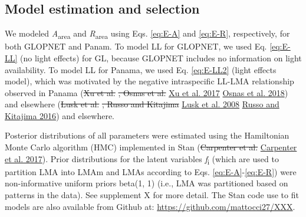 \documentclass[
  12pt,
]{article}
\providecommand{\DIFaddtex}[1]{{\protect\color{blue}\uwave{#1}}} %
\providecommand{\DIFdeltex}[1]{{\protect\color{red}\sout{#1}}}                      %
\providecommand{\DIFaddbegin}{} %
\providecommand{\DIFaddend}{} %
\providecommand{\DIFdelbegin}{} %
\providecommand{\DIFdelend}{} %
\providecommand{\DIFadd}[1]{\texorpdfstring{\DIFaddtex{#1}}{#1}} %
\providecommand{\DIFdel}[1]{\texorpdfstring{\DIFdeltex{#1}}{}} %
\newcommand{\DIFscaledelfig}{0.5}
\newlength{\DIFdelgraphicswidth} %
\newlength{\DIFdelgraphicsheight} %
\newcommand{\DIFaddincludegraphics}[2][]{{\color{blue}\fbox{\DIFOincludegraphics[#1]{#2}}}} %
\newcommand{\DIFdelincludegraphics}[2][]{%
\sbox{\DIFdelgraphicsbox}{\DIFOincludegraphics[#1]{#2}}%
\settoboxwidth{\DIFdelgraphicswidth}{\DIFdelgraphicsbox} %
\settoboxtotalheight{\DIFdelgraphicsheight}{\DIFdelgraphicsbox} %
\scalebox{\DIFscaledelfig}{%
\parbox[b]{\DIFdelgraphicswidth}{\usebox{\DIFdelgraphicsbox}\\[-\baselineskip] \rule{\DIFdelgraphicswidth}{0em}}\llap{\resizebox{\DIFdelgraphicswidth}{\DIFdelgraphicsheight}{%
\setlength{\unitlength}{\DIFdelgraphicswidth}%
\begin{picture}(1,1)%
\thicklines\linethickness{2pt} %
{\color[rgb]{1,0,0}\put(0,0){\framebox(1,1){}}}%
{\color[rgb]{1,0,0}\put(0,0){\line( 1,1){1}}}%
{\color[rgb]{1,0,0}\put(0,1){\line(1,-1){1}}}%
\end{picture}%
}\hspace*{3pt}}} %
} %
\DeclareRobustCommand{\DIFaddbegin}{\DIFOaddbegin \let\includegraphics\DIFaddincludegraphics} %
\DeclareRobustCommand{\DIFaddend}{\DIFOaddend \let\includegraphics\DIFOincludegraphics} %
\DeclareRobustCommand{\DIFdelbegin}{\DIFOdelbegin \let\includegraphics\DIFdelincludegraphics} %
\DeclareRobustCommand{\DIFdelend}{\DIFOaddend \let\includegraphics\DIFOincludegraphics} %
\begin{document}
\hypertarget{model-estimation-and-selection}{%
\subsection{Model estimation and selection}\label{model-estimation-and-selection}}

We modeled \emph{A}\textsubscript{area} and \emph{R}\textsubscript{area} using Eqs. \eqref{eq:E-A} and \eqref{eq:E-R}, respectively, for both GLOPNET and Panam.
To model LL for GLOPNET, we used Eq. \eqref{eq:E-LL} (no light effects) for GL, because GLOPNET includes no information on light availability.
To model LL for Panama, we used Eq. \eqref{eq:E-LL2} (light effects model), which was motivated by the negative intraspecific LL-LMA relationship observed in Panama (\DIFdelbegin \DIFdel{Xu et al. }\DIFdelend \protect\DIFdelbegin %
\DIFdel{, Osnas et al. }\DIFdelend \DIFaddbegin \hyperlink{ref-Xu2017}{Xu et al. 2017}\DIFadd{, }\DIFaddend \protect\DIFdelbegin %
\DIFdelend \DIFaddbegin \hyperlink{ref-Osnas2018}{Osnas et al. 2018}\DIFaddend ) and elsewhere (\DIFdelbegin \DIFdel{Lusk et al. }\DIFdelend \protect\DIFdelbegin %
\DIFdel{, Russo and Kitajima }\DIFdelend \DIFaddbegin \hyperlink{ref-Lusk2008}{Lusk et al. 2008}\DIFadd{, }\DIFaddend \protect\DIFdelbegin %
\DIFdelend \DIFaddbegin \hyperlink{ref-Russo2016}{Russo and Kitajima 2016}\DIFaddend ) and elsewhere.

Posterior distributions of all parameters were estimated using the Hamiltonian Monte Carlo algorithm (HMC) implemented in Stan (\DIFdelbegin \DIFdel{Carpenter et al. }\DIFdelend \protect\DIFdelbegin %
\DIFdelend \DIFaddbegin \hyperlink{ref-Carpenter2017}{Carpenter et al. 2017}\DIFaddend ).
Prior distributions for the latent variables \emph{f}\textsubscript{i} (which are used to partition LMA into LMAm and LMAs according to Eqs. \eqref{eq:E-A}-\eqref{eq:E-R}) were non-informative uniform priors beta(1, 1) (i.e., LMA was partitioned based on patterns in the data). See supplement X for more detail.
The Stan code use to fit models are also available from Github at: \href{https://github.com/mattocci27/LMAmLMAs}{https://github.com/mattocci27/XXX}.
\end{document}
